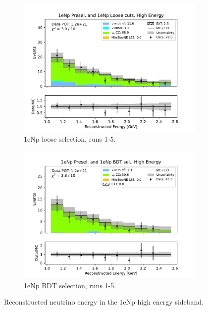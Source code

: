 \begin{figure}[H]
\begin{subfigure}{0.33\linewidth}
    \includegraphics[width=\linewidth]{technote/Sidebands/Figures/FarSideband/far_sideband_reco_e_run1234a4b4c4d5_NP_NPL_HIGH_ENERGY.pdf}
    \caption{1eNp loose selection, runs 1-5.}
    \end{subfigure}%
    \begin{subfigure}{0.33\linewidth}
    \includegraphics[width=\linewidth]{technote/Sidebands/Figures/FarSideband/far_sideband_reco_e_run1234a4b4c4d5_NP_NPBDT_HIGH_ENERGY.pdf}
    \caption{1eNp BDT selection, runs 1-5.}
    \end{subfigure}
    \caption{Reconstructed neutrino energy in the 1eNp high energy sideband.}
     \label{fig:HighEnergy1eNp_reco_e}
\end{figure}

